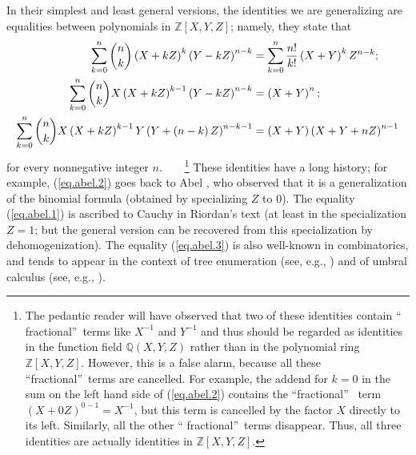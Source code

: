 \documentclass[numbers=enddot,12pt,final,onecolumn,notitlepage]{scrartcl}%
\theoremstyle{definition}
\let\sumnonlimits\sum
\renewcommand{\sum}{\sumnonlimits\limits}
\begin{document}
In their simplest and least general versions, the identities we are
generalizing are equalities between polynomials in $\mathbb{Z}\left[
X,Y,Z\right]  $; namely, they state that
\begin{align}
\sum_{k=0}^{n}\dbinom{n}{k}\left(  X+kZ\right)  ^{k}\left(  Y-kZ\right)
^{n-k}  &  =\sum_{k=0}^{n}\dfrac{n!}{k!}\left(  X+Y\right)  ^{k}%
Z^{n-k};\label{eq.abel.1}\\
\sum_{k=0}^{n}\dbinom{n}{k}X\left(  X+kZ\right)  ^{k-1}\left(  Y-kZ\right)
^{n-k}  &  =\left(  X+Y\right)  ^{n};\label{eq.abel.2}\\
\sum_{k=0}^{n}\dbinom{n}{k}X\left(  X+kZ\right)  ^{k-1}Y\left(  Y+\left(
n-k\right)  Z\right)  ^{n-k-1}  &  =\left(  X+Y\right)  \left(  X+Y+nZ\right)
^{n-1} \label{eq.abel.3}%
\end{align}
for every nonnegative integer $n$.\ \ \ \ \footnote{The pedantic reader will
have observed that two of these identities contain \textquotedblleft
fractional\textquotedblright\ terms like $X^{-1}$ and $Y^{-1}$ and thus should
be regarded as identities in the function field $\mathbb{Q}\left(
X,Y,Z\right)  $ rather than in the polynomial ring $\mathbb{Z}\left[
X,Y,Z\right]  $. However, this is a false alarm, because all these
\textquotedblleft fractional\textquotedblright\ terms are cancelled. For
example, the addend for $k=0$ in the sum on the left hand side of
(\ref{eq.abel.2}) contains the \textquotedblleft fractional\textquotedblright%
\ term $\left(  X+0Z\right)  ^{0-1}=X^{-1}$, but this term is cancelled by the
factor $X$ directly to its left. Similarly, all the other \textquotedblleft
fractional\textquotedblright\ terms disappear. Thus, all three identities are
actually identities in $\mathbb{Z}\left[  X,Y,Z\right]  $.} These identities
have a long history; for example, (\ref{eq.abel.2}) goes back to Abel
\cite{Abel26}, who observed that it is a generalization of the binomial
formula (obtained by specializing $Z$ to $0$). The equality (\ref{eq.abel.1})
is ascribed to Cauchy in Riordan's text \cite[\S 1.5, Cauchy's identity]%
{Riorda68} (at least in the specialization $Z=1$; but the general version can
be recovered from this specialization by dehomogenization). The equality
(\ref{eq.abel.3}) is also well-known in combinatorics, and tends to appear in
the context of tree enumeration (see, e.g., \cite[Theorem 2]{Grinbe17}) and of
umbral calculus (see, e.g., \cite[Section 2.6, Example 3]{Roman84}).
\end{document}
